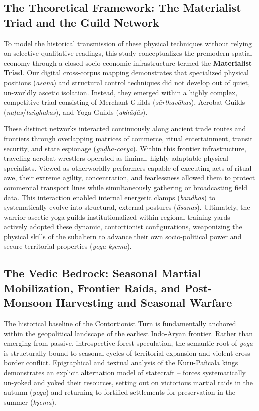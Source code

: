 \documentclass[11pt,twoside,letterpaper]{article}
\begin{document}
\subsection{The Theoretical Framework: The Materialist Triad and the Guild Network}
To model the historical transmission of these physical techniques without relying on selective qualitative readings, this study conceptualizes the premodern spatial economy through a closed socio-economic infrastructure termed the \textbf{Materialist Triad}. Our digital cross-corpus mapping demonstrates that specialized physical positions (\textit{āsana}) and structural control techniques did not develop out of quiet, un-worldly ascetic isolation. Instead, they emerged within a highly complex, competitive triad consisting of Merchant Guilds (\textit{sārthavāhas}), Acrobat Guilds (\textit{naṭas}/\textit{laṅghakas}), and Yoga Guilds (\textit{akhāḍās}). 
 
These distinct networks interacted continuously along ancient trade routes and frontiers through overlapping matrices of commerce, ritual entertainment, transit security, and state espionage (\textit{gūḍha-caryā}). Within this frontier infrastructure, traveling acrobat-wrestlers operated as liminal, highly adaptable physical specialists. Viewed as otherworldly performers capable of executing acts of ritual awe, their extreme agility, concentration, and fearlessness allowed them to protect commercial transport lines while simultaneously gathering or broadcasting field data. This interaction enabled internal energetic clamps (\textit{bandhas}) to systematically evolve into structural, external postures (\textit{āsanas}). Ultimately, the warrior ascetic yoga guilds institutionalized within regional training yards actively adopted these dynamic, contortionist configurations, weaponizing the physical skills of the subaltern to advance their own socio-political power and secure territorial properties (\textit{yoga-kṣema}).

\subsection{The Vedic Bedrock: Seasonal Martial Mobilization, Frontier Raids, and Post-Monsoon Harvesting and Seasonal Warfare}

The historical baseline of the Contortionist Turn is fundamentally anchored within the geopolitical landscape of the earliest Indo-Aryan frontier. Rather than emerging from passive, introspective forest speculation, the semantic root of \textit{yoga} is structurally bound to seasonal cycles of territorial expansion and violent cross-border conflict. Epigraphical and textual analysis of the Kuru-Pañcāla kings demonstrates an explicit alternation model of statecraft -- forces systematically un-yoked and yoked their resources, setting out on victorious martial raids in the autumn (\textit{yoga}) and returning to fortified settlements for preservation in the summer (\textit{kṣema}). 
\end{document}
